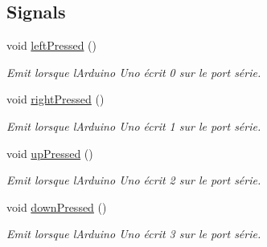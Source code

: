 \subsection*{Signals}
\begin{DoxyCompactItemize}
\item 
\hypertarget{class_arduino_handler_a30502ceb7b61c7275c34061c604abd36}{}void \hyperlink{class_arduino_handler_a30502ceb7b61c7275c34061c604abd36}{left\+Pressed} ()\label{class_arduino_handler_a30502ceb7b61c7275c34061c604abd36}

\begin{DoxyCompactList}\small\item\em Emit lorsque l\textquotesingle{}Arduino Uno écrit \textquotesingle{}0\textquotesingle{} sur le port série. \end{DoxyCompactList}\item 
\hypertarget{class_arduino_handler_a07a1f4bd13691bd7c857c32c8112853b}{}void \hyperlink{class_arduino_handler_a07a1f4bd13691bd7c857c32c8112853b}{right\+Pressed} ()\label{class_arduino_handler_a07a1f4bd13691bd7c857c32c8112853b}

\begin{DoxyCompactList}\small\item\em Emit lorsque l\textquotesingle{}Arduino Uno écrit \textquotesingle{}1\textquotesingle{} sur le port série. \end{DoxyCompactList}\item 
\hypertarget{class_arduino_handler_a62ed3d1594cc371d54208225c2b2bdba}{}void \hyperlink{class_arduino_handler_a62ed3d1594cc371d54208225c2b2bdba}{up\+Pressed} ()\label{class_arduino_handler_a62ed3d1594cc371d54208225c2b2bdba}

\begin{DoxyCompactList}\small\item\em Emit lorsque l\textquotesingle{}Arduino Uno écrit \textquotesingle{}2\textquotesingle{} sur le port série. \end{DoxyCompactList}\item 
\hypertarget{class_arduino_handler_acba961acc6381ad00adf46bd0cf14ad0}{}void \hyperlink{class_arduino_handler_acba961acc6381ad00adf46bd0cf14ad0}{down\+Pressed} ()\label{class_arduino_handler_acba961acc6381ad00adf46bd0cf14ad0}

\begin{DoxyCompactList}\small\item\em Emit lorsque l\textquotesingle{}Arduino Uno écrit \textquotesingle{}3\textquotesingle{} sur le port série. \end{DoxyCompactList}\end{DoxyCompactItemize}
